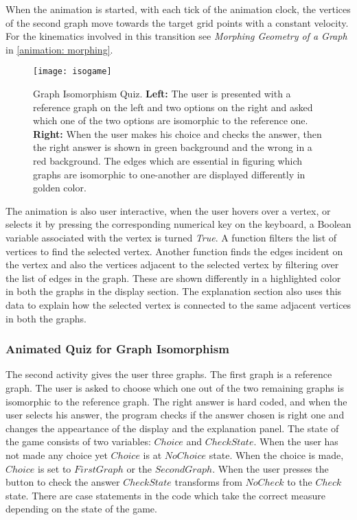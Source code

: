 When the animation is started, with each tick of the animation clock, the
vertices of the second graph move towards the target grid points with a
constant velocity. For the kinematics involved in this transition see
\emph{Morphing Geometry of a Graph} in \autoref{animation: morphing}.

\begin{figure}[h]
\centering
\texttt{[image: isogame]}
\caption{
         Graph Isomorphism Quiz. 
         \textbf{Left:} The user is presented with a reference graph on the left and two
         options on the right and asked which one of the two options are
         isomorphic to the reference one.
         \textbf{Right:} When the user makes his choice and checks the answer,
         then the right answer is shown in green background and the wrong in a red background.
         The edges which are essential in figuring which graphs are isomorphic to one-another
         are displayed differently in golden color.
        }
\label{animationfigure: isomorphicGame}
\end{figure}
The animation is also user interactive, when the user hovers over a vertex, or
selects it by pressing the corresponding numerical key on the keyboard, a
Boolean variable associated with the vertex is turned \emph{True}. A function
filters the list of vertices to find the selected vertex. Another function
finds the edges incident on the vertex and also the vertices adjacent to the
selected vertex by filtering over the list of edges in the graph. These are
shown differently in a highlighted color in both the graphs in the display
section.  The explanation section also uses this data to explain how the
selected vertex is connected to the same adjacent vertices in both the graphs.

\subsubsection{Animated Quiz for Graph Isomorphism}
The second activity gives the user three graphs. The first graph is a reference
graph. The user is asked to choose which one out of the two remaining graphs is
isomorphic to the reference graph. The right answer is hard coded, and when the
user selects his answer, the program checks if the answer chosen is right one
and changes the appeartance of the display and the explanation panel.  The
state of the game consists of two variables: $Choice$ and $CheckState$.  When
the user has not made any choice yet $Choice$ is at $NoChoice$ state.  When the
choice is made, $Choice$ is set to $FirstGraph$ or the $SecondGraph$.  When the
user presses the button to check the answer $CheckState$ transforms from
$NoCheck$ to the $Check$ state.  There are case statements in the code which
take the correct measure depending on the state of the game.

